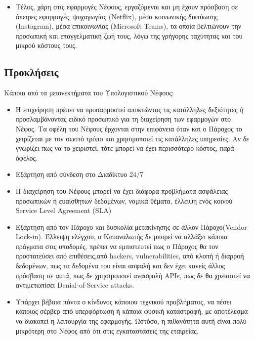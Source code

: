 \documentclass{article}
\begin{document}
\begin{itemize}
\item	Τέλος, χάρη στις εφαρμογές Νέφους, εργαζόμενοι και μη έχουν πρόσβαση σε άπειρες εφαρμογές, ψυχαγωγίας (Netflix), μέσα κοινωνικής δικτύωσης (Instagram), μέσα επικοινωνίας (Microsoft Teams), τα οποία βελτιώνουν την προσωπική και επαγγελματική ζωή τους, λόγω της γρήγορης ταχύτητας και του μικρού κόστους τους.
\end{itemize}
\subsection{Προκλήσεις}
Κάποια από τα μειονεκτήματα του Υπολογιστικού Νέφους:
\begin{itemize}
\item	Η επιχείρηση πρέπει να προσαρμοστεί αποκτώντας τις κατάλληλες δεξιότητες ή προσλαμβάνοντας ειδικό προσωπικό για τη διαχείρηση των εφαρμογών στο Νέφος. Τα οφέλη του Νέφους έρχονται στην επιφάνεια όταν και ο Πάροχος το χειρίζεται με τον σωστό τρόπο και χρησιμοποιεί τις κατάλληλες υπηρεσίες. Αν δε γνωρίζει πως να το χειριστεί, τότε μπορεί να έχει περισσότερο κόστος, παρά όφελος.
\item	Εξάρτηση από σύνδεση στο Διαδίκτυο 24/7
\item	Η διαχείρηση του Νέφους μπορεί να έχει διάφορα προβλήματα ασφάλειας προσωπικών ή ευαίσθητων δεδομένων,  νομικά θέματα, έλλειψη ενός κοινού Service Level Agreement (SLA)
\item	Εξάρτηση από τον Πάροχο και δυσκολία μετακίνησης σε άλλον Πάροχο(Vendor Lock-in).  Έλλειψη ελέγχου, ο Καταναλωτής δε μπορεί να αλλάξει κάποια πράγματα στις υποδομές, πρέπει να εμπιστευτεί πως ο Πάροχος θα τον προστατεύσει από επιθέσεις,από hackers, vulnerabilities, από κλοπή ή διαρροή δεδομένων, πως τα δεδομένα του είναι ασφαλή και δεν έχει κανείς άλλος πρόσβαση σε αυτά, πως δε χρησιμοποιεί ανασφαλή APIs, πως δε θα χρειαστεί να αντιμετωπίσει  Denial-of-Service attacks.
\item	Υπάρχει βέβαια πάντα ο κίνδυνος κάποιου τεχνικού προβλήματος, να πέσει κάποιος σέρβερ από υπερφόρτωση ή κάποια φυσική καταστροφή, με αποτέλεσμα να διακοπεί η λειτουργία της εφαρμογής. Ωστόσο, η πιθανότητα αυτή είναι πολύ μικρότερη στο Νέφος από ότι στις εγκαταστάσεις της εταιρείας.

\end{itemize}
\end{document}
